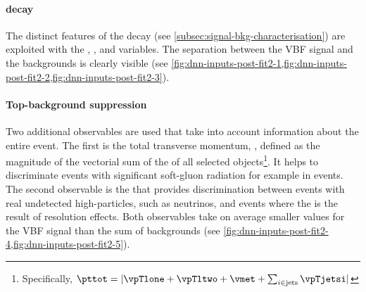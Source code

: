 \paragraph{\HWW decay}
The distinct features of the \HWW decay (see \cref{subsec:signal-bkg-characterisation}) are exploited with the \dphill, \mll, and \mT variables.
The separation between the VBF signal and the backgrounds is clearly visible (see \cref{fig:dnn-inputs-post-fit2-1,fig:dnn-inputs-post-fit2-2,fig:dnn-inputs-post-fit2-3}).

\paragraph{Top-background suppression}
Two additional observables are used that take into account information about the entire event.
The first is the total transverse momentum, \pttot, defined as the magnitude of the vectorial sum of the \pT of all selected objects\footnote{Specifically, $\pttot = | \vpTlone + \vpTltwo + \vmet + \sum_{i \in \text{jets}} \vpTjetsi |$}. It helps to discriminate events with significant soft-gluon radiation for example in \ttbar events. The second observable is the \METSig that provides discrimination between events with real undetected high-\pT particles, such as neutrinos, and events where the \MET is the result of resolution effects. Both observables take on average smaller values for the VBF signal than the sum of backgrounds (see \cref{fig:dnn-inputs-post-fit2-4,fig:dnn-inputs-post-fit2-5}).

